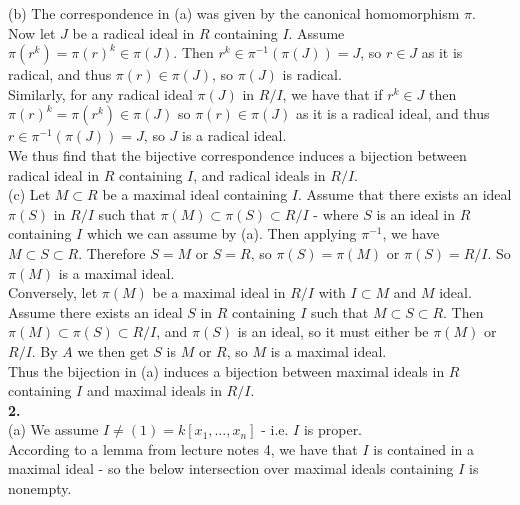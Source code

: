 \documentclass[a4paper]{article}
\begin{document}
    (b) The correspondence in (a) was given by the canonical homomorphism
    $\pi$.\\
    Now let $J$ be a radical ideal in $R$ containing $I$.
    Assume $\pi(r^{k}) = \pi (r)^{k} \in \pi(J)$. Then
    $r^{k} \in \pi^{-1} \left( \pi (J) \right) = J$, so $r \in J$ as it is
    radical, and thus $\pi(r) \in \pi(J)$, so $\pi(J)$ is radical.\\
    Similarly, for any radical ideal $\pi (J)$ in $R /I$, we have
    that if $r^{k} \in J$ then $\pi(r)^{k} = \pi(r^{k}) \in  \pi(J)$ so
    $\pi(r) \in \pi(J)$ as it is a radical ideal, and thus $r \in \pi^{-1} \left(
    \pi (J) \right) = J$, so $J$ is a radical ideal.\\
    We thus find that the bijective correspondence induces a bijection between
    radical ideal in $R$ containing $I$, and radical ideals in $R /I$.\\
    \linebreak
    (c) Let $M \subset R$ be a maximal ideal containing $I$. 
    Assume that there exists an ideal $\pi(S)$ in $R /I$ such that
    $\pi(M) \subset \pi(S) \subset R /I$ - where $S$ is an ideal in $R$ 
    containing $I$ which we can assume by (a).
    Then applying $\pi^{-1}$, we have
    $M \subset S \subset R$.
    Therefore  $S = M$ or $S = R$, so $\pi(S) = \pi(M)$ or $\pi(S) = R /I $. 
    So $\pi (M)$ is a maximal ideal.\\
    \linebreak
    Conversely, let $\pi(M)$ be a maximal ideal in $R /I$ with $I \subset M$ 
    and $M$ ideal.
    Assume there exists an ideal $S$ in $R$ containing $I$ such that
    $M \subset S \subset R$. Then
    $\pi(M) \subset \pi(S) \subset R /I$, and $\pi(S)$ is an ideal, so
    it must either be $\pi(M)$ or $R /I$. By $A$ we then get $S$ is $M$ or $R$,
    so
    $M$ is a maximal ideal.\\
    \linebreak
    Thus the bijection in (a) induces a bijection between maximal ideals in $R$ 
    containing $I$ and maximal ideals in $R /I$.\\
    \linebreak
    \textbf{2.}\\
    (a) We assume $I \neq (1) = k \left[ x_1, \ldots, x_n \right] $ - i.e. $I$ 
    is proper.\\
    According to a lemma from lecture notes 4, we have that $I$ is contained in
    a maximal ideal - so the below intersection over maximal ideals containing
    $I$ is nonempty.\\
\end{document}
